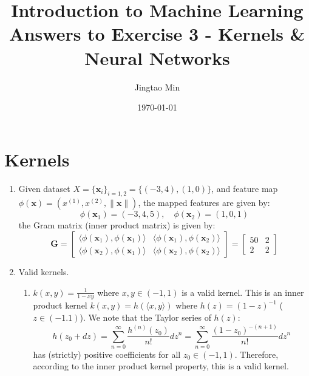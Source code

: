 \documentclass[a4paper, 10pt]{article}
\title{\bfseries Introduction to Machine Learning \\ Answers to Exercise 3 - Kernels \& Neural Networks}
\author{Jingtao Min}
\date{\today}
\begin{document}
\maketitle

\section{Kernels}

\begin{enumerate}[label=(\alph*)]
    \item Given dataset $X = \{\mathbf{x}_i\}_{i=1,2} = \{(-3,4),(1,0)\}$, and feature map $\phi(\mathbf{x}) = (x^{(1)}, x^{(2)}, \|\mathbf{x}\|)$, the mapped features are given by:
    \begin{equation}
        \phi(\mathbf{x}_1) = (-3, 4, 5),\quad \phi(\mathbf{x}_2) = (1, 0, 1)
    \end{equation}
    the Gram matrix (inner product matrix) is given by:
    \begin{equation}
        \mathbf{G} = \begin{bmatrix}
            \langle \phi(\mathbf{x}_1), \phi(\mathbf{x}_1) \rangle & \langle \phi(\mathbf{x}_1), \phi(\mathbf{x}_2) \rangle \\
            \langle \phi(\mathbf{x}_2), \phi(\mathbf{x}_1) \rangle & \langle \phi(\mathbf{x}_2), \phi(\mathbf{x}_2) \rangle
        \end{bmatrix} = 
        \begin{bmatrix}
            50 & 2 \\ 2 & 2
        \end{bmatrix}
    \end{equation}
    
    \item Valid kernels.
    \begin{enumerate}[label=(\arabic*)]
        \item $k(x, y) = \frac{1}{1 - xy}$ where $x, y \in (-1, 1)$ is a valid kernel. This is an inner product kernel $k(x, y) = h(\langle x, y\rangle)$ where $h(z) = (1-z)^{-1}$ ($z\in (-1. 1)$). We note that the Taylor series of $h(z)$:
        \begin{equation}
            h(z_0 + dz) = \sum_{n=0}^\infty \frac{h^{(n)}(z_0)}{n!}dz^n = \sum_{n=0}^\infty \frac{(1-z_0)^{-(n+1)}}{n!}dz^n
        \end{equation}
        has (strictly) positive coefficients for all $z_0\in (-1, 1)$. Therefore, according to the inner product kernel property, this is a valid kernel.
        

\end{enumerate}
\end{enumerate}
\end{document}
